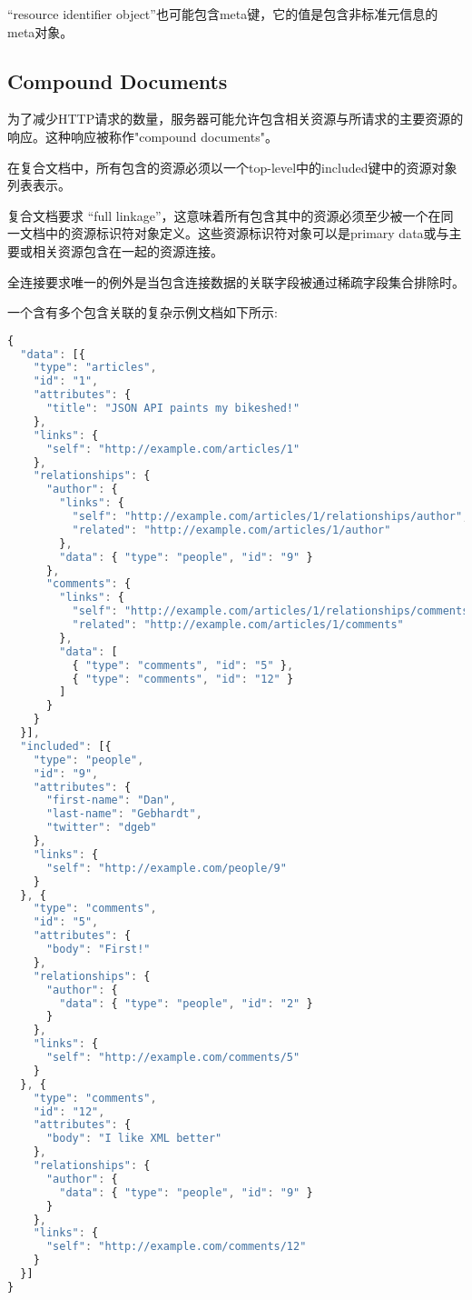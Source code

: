 “resource identifier object”也可能包含meta键，它的值是包含非标准元信息的meta对象。



\subsection{Compound Documents}

为了减少HTTP请求的数量，服务器可能允许包含相关资源与所请求的主要资源的响应。这种响应被称作"compound documents"。

在复合文档中，所有包含的资源必须以一个top-level中的included键中的资源对象列表表示。

复合文档要求 “full linkage”，这意味着所有包含其中的资源必须至少被一个在同一文档中的资源标识符对象定义。这些资源标识符对象可以是primary data或与主要或相关资源包含在一起的资源连接。

全连接要求唯一的例外是当包含连接数据的关联字段被通过稀疏字段集合排除时。

一个含有多个包含关联的复杂示例文档如下所示:



\begin{lstlisting}[language=JavaScript]
{
  "data": [{
    "type": "articles",
    "id": "1",
    "attributes": {
      "title": "JSON API paints my bikeshed!"
    },
    "links": {
      "self": "http://example.com/articles/1"
    },
    "relationships": {
      "author": {
        "links": {
          "self": "http://example.com/articles/1/relationships/author",
          "related": "http://example.com/articles/1/author"
        },
        "data": { "type": "people", "id": "9" }
      },
      "comments": {
        "links": {
          "self": "http://example.com/articles/1/relationships/comments",
          "related": "http://example.com/articles/1/comments"
        },
        "data": [
          { "type": "comments", "id": "5" },
          { "type": "comments", "id": "12" }
        ]
      }
    }
  }],
  "included": [{
    "type": "people",
    "id": "9",
    "attributes": {
      "first-name": "Dan",
      "last-name": "Gebhardt",
      "twitter": "dgeb"
    },
    "links": {
      "self": "http://example.com/people/9"
    }
  }, {
    "type": "comments",
    "id": "5",
    "attributes": {
      "body": "First!"
    },
    "relationships": {
      "author": {
        "data": { "type": "people", "id": "2" }
      }
    },
    "links": {
      "self": "http://example.com/comments/5"
    }
  }, {
    "type": "comments",
    "id": "12",
    "attributes": {
      "body": "I like XML better"
    },
    "relationships": {
      "author": {
        "data": { "type": "people", "id": "9" }
      }
    },
    "links": {
      "self": "http://example.com/comments/12"
    }
  }]
}
\end{lstlisting}


